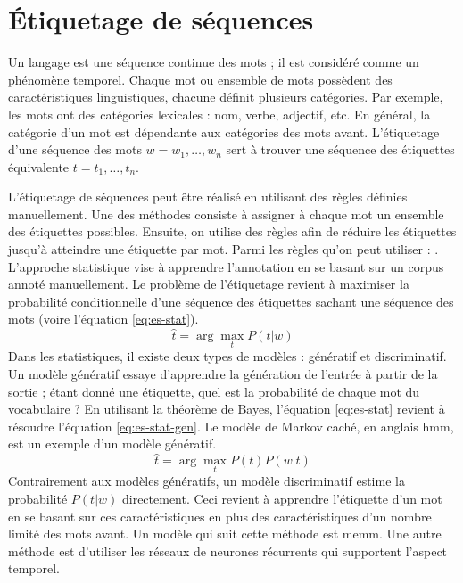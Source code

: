 \documentclass{KodeBook}
\begin{document}
\section{Étiquetage de séquences}

Un langage est une séquence continue des mots ; il est considéré comme un phénomène temporel.
Chaque mot ou ensemble de mots possèdent des caractéristiques linguistiques, chacune définit plusieurs catégories. 
Par exemple, les mots ont des catégories lexicales : nom, verbe, adjectif, etc.
En général, la catégorie d'un mot est dépendante aux catégories des mots avant.
L'étiquetage d'une séquence des mots $w = w_1, \ldots, w_n$ sert à trouver une séquence des étiquettes équivalente $t = t_1, \ldots, t_n$. 

L'étiquetage de séquences peut être réalisé en utilisant des règles définies manuellement. 
Une des méthodes consiste à assigner à chaque mot un ensemble des étiquettes possibles. 
Ensuite, on utilise des règles afin de réduire les étiquettes jusqu'à atteindre une étiquette par mot.
Parmi les règles qu'on peut utiliser : . 
L'approche statistique vise à apprendre l'annotation en se basant sur un corpus annoté manuellement. 
Le problème de l'étiquetage revient à maximiser la probabilité conditionnelle d'une séquence des étiquettes sachant une séquence des mots (voire l'équation \ref{eq:es-stat}).
\begin{equation}\label{eq:es-stat}
	\hat{t} = \arg\max\limits_t P(t | w)
\end{equation}
Dans les statistiques, il existe deux types de modèles : génératif et discriminatif. 
Un modèle génératif essaye d'apprendre la génération de l'entrée à partir de la sortie ; étant donné une étiquette, quel est la probabilité de chaque mot du vocabulaire ?
En utilisant la théorème de Bayes, l'équation \ref{eq:es-stat} revient à résoudre l'équation \ref{eq:es-stat-gen}.
Le modèle de Markov caché, en anglais \ac{hmm}, est un exemple d'un modèle génératif.
\begin{equation}\label{eq:es-stat-gen}
	\hat{t} = \arg\max\limits_t P(t) P(w | t) 
\end{equation}
Contrairement aux modèles génératifs, un modèle discriminatif estime la probabilité $P(t | w)$ directement. 
Ceci revient à apprendre l'étiquette d'un mot en se basant sur ces caractéristiques en plus des caractéristiques d'un nombre limité des mots avant.
Un modèle qui suit cette méthode est \ac{memm}.
Une autre méthode est d'utiliser les réseaux de neurones récurrents qui supportent l'aspect temporel. 
\end{document}
